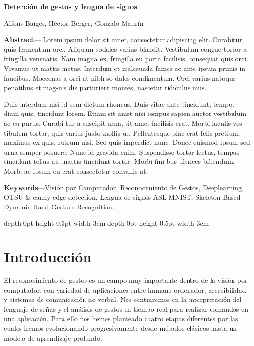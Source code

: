\documentclass[10pt,a4paper,twocolumn,twoside]{article}
\begin{document}
{\sffamily
\noindent\textbf{\LARGE Detección de gestos y lengua de signos}
\begin{center}
Alfons Baiges, Héctor Berger, Gonzalo Maurín
\end{center}

\bigskip
\bigskip

\noindent 
\textbf{Abstract}--- Lorem ipsum dolor sit amet, consectetur adipiscing elit. Curabitur quis fermentum orci. Aliquam sodales varius blandit. Vestibulum congue tortor a fringilla venenatis. Nam magna ex, fringilla eu porta facilisis, consequat quis orci. Vivamus ut mattis metus. Interdum et malesuada fames ac ante ipsum primis in faucibus. Maecenas a orci at nibh so-dales condimentum. Orci varius natoque penatibus et mag-nis dis parturient montes, nascetur ridiculus mus. 


Duis interdum nisi id sem dictum rhoncus. Duis vitae ante tincidunt, tempor diam quis, tincidunt lorem. Etiam sit amet nisi tempus sapien auctor vestibulum ac eu purus. Curabi-tur a suscipit urna, sit amet facilisis erat. Morbi iaculis ves-tibulum tortor, quis varius justo mollis ut. Pellentesque plac-erat felis pretium, maximus ex quis, rutrum nisi. Sed quis imperdiet nunc. Donec euismod ipsum sed urna semper posuere. Nunc id gravida enim. Suspendisse tortor lectus, tempus tincidunt tellus at, mattis tincidunt tortor. Morbi fini-bus ultrices bibendum. Morbi ac ipsum eu erat consectetur convallis at. 

\bigskip

\noindent 
\textbf{Keywords}---Visión por Computador, Reconocimiento de Gestos, Deeplearning, OTSU \& canny edge detection, Lengua de signos ASL MNIST, Skeleton-Based Dynamic Hand Gesture Recognition.
}
\bigskip

{\vrule depth 0pt height 0.5pt width 3cm\hspace{7.5pt}%
%
\hspace{7.5pt}\vrule depth 0pt height 0.5pt width 3cm\relax}

\bigskip


\section{Introducción}

El reconocimiento de gestos es un campo muy importante dentro de la visión por computador, 
con variedad de aplicaciones entre humano-ordenador, accesibilidad y sistemas de comunicación no verbal. 
Nos centraremos en la interpretación del lenguaje de señas y el análisis de gestos en tiempo real para realizar comandos en una aplicación. 
Para ello nos hemos planteado cuatro etapas diferentes por las cuales iremos evolucionando progresivamente desde métodos clásicos hasta un modelo de aprendizaje profundo. 
\end{document}
